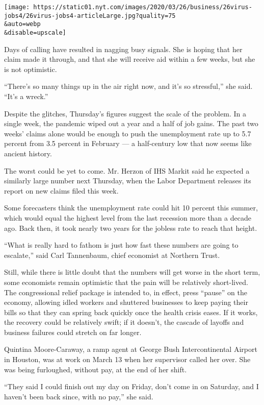 \texttt{[image: https://static01.nyt.com/images/2020/03/26/business/26virus-jobs4/26virus-jobs4-articleLarge.jpg?quality=75\\\&auto=webp\\\&disable=upscale]}

Days of calling have resulted in nagging busy signals. She is hoping
that her claim made it through, and that she will receive aid within a
few weeks, but she is not optimistic.

``There's so many things up in the air right now, and it's so
stressful,'' she said. ``It's a wreck.''

Despite the glitches, Thursday's figures suggest the scale of the
problem. In a single week, the pandemic wiped out a year and a half of
job gains. The past two weeks' claims alone would be enough to push the
unemployment rate up to 5.7 percent from 3.5 percent in February --- a
half-century low that now seems like ancient history.

The worst could be yet to come. Mr. Herzon of IHS Markit said he
expected a similarly large number next Thursday, when the Labor
Department releases its report on new claims filed this week.

Some forecasters think the unemployment rate could hit 10 percent this
summer, which would equal the highest level from the last recession more
than a decade ago. Back then, it took nearly two years for the jobless
rate to reach that height.

``What is really hard to fathom is just how fast these numbers are going
to escalate,'' said Carl Tannenbaum, chief economist at Northern Trust.

Still, while there is little doubt that the numbers will get worse in
the short term, some economists remain optimistic that the pain will be
relatively short-lived. The congressional relief package is intended to,
in effect, press ``pause'' on the economy, allowing idled workers and
shuttered businesses to keep paying their bills so that they can spring
back quickly once the health crisis eases. If it works, the recovery
could be relatively swift; if it doesn't, the cascade of layoffs and
business failures could stretch on far longer.

Quintina Moore-Caraway, a ramp agent at George Bush Intercontinental
Airport in Houston, was at work on March 13 when her supervisor called
her over. She was being furloughed, without pay, at the end of her
shift.

``They said I could finish out my day on Friday, don't come in on
Saturday, and I haven't been back since, with no pay,'' she said.

